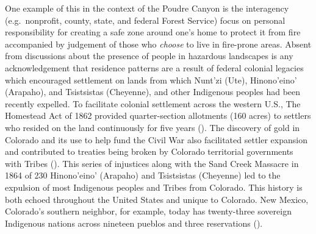 \documentclass[
]{article}
\begin{document}
One example of this in the context of the Poudre Canyon is the interagency (e.g.~nonprofit, county, state, and federal Forest Service) focus on personal responsibility for creating a safe zone around one's home to protect it from fire accompanied by judgement of those who \emph{choose} to live in fire-prone areas. Absent from discussions about the presence of people in hazardous landscapes is any acknowledgement that residence patterns are a result of federal colonial legacies which encouraged settlement on lands from which Nunt'zi (Ute), Hinono'eino' (Arapaho), and Tsistsistas (Cheyenne), and other Indigenous peoples had been recently expelled. To facilitate colonial settlement across the western U.S., The Homestead Act of 1862 provided quarter-section allotments (160 acres) to settlers who resided on the land continuously for five years (). The discovery of gold in Colorado and its use to help fund the Civil War also facilitated settler expansion and contributed to treaties being broken by Colorado territorial governments with Tribes (). This series of injustices along with the Sand Creek Massacre in 1864 of 230 Hinono'eino' (Arapaho) and Tsistsistas (Cheyenne) led to the expulsion of most Indigenous peoples and Tribes from Colorado. This history is both echoed throughout the United States and unique to Colorado. New Mexico, Colorado's southern neighbor, for example, today has twenty-three sovereign Indigenous nations across nineteen pueblos and three reservations ().
\end{document}
